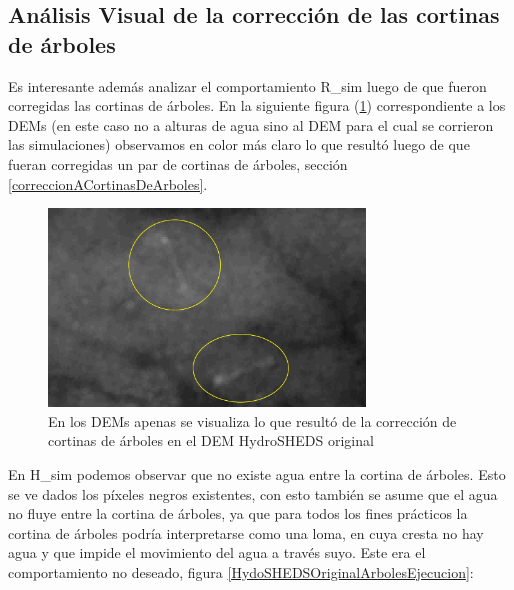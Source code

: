 \documentclass[10pt,a4paper, twoside]{report}
\begin{document}
\subsection{Análisis Visual de la corrección de las cortinas de árboles}

Es interesante además analizar el comportamiento R\_sim luego de que fueron corregidas las cortinas de árboles. En la siguiente figura (\ref{HydoSHEDSOriginalArboles}) correspondiente a los DEMs (en este caso no a alturas de agua sino al DEM para el cual se corrieron las simulaciones) observamos en color más claro lo que resultó luego de que fueran corregidas un par de cortinas de árboles, sección \ref{correccionACortinasDeArboles}. 

\begin{figure}[H]
   \centering      
   \includegraphics[width=0.75\textwidth]{imagenes/HydoSHEDSOriginalArboles.jpg}
 \caption{En los DEMs apenas se visualiza lo que resultó de la corrección de cortinas de árboles en el DEM HydroSHEDS original}
 \label{HydoSHEDSOriginalArboles}
\end{figure}


En H\_sim podemos observar que no existe agua entre la cortina de árboles. Esto se ve dados los píxeles negros existentes, con esto también se asume que el agua no fluye entre la cortina de árboles, ya que para todos los fines prácticos la cortina de árboles podría interpretarse como una loma, en cuya cresta no hay agua y que impide el movimiento del agua a través suyo. Este era el comportamiento no deseado, figura \ref{HydoSHEDSOriginalArbolesEjecucion}:
\end{document}
